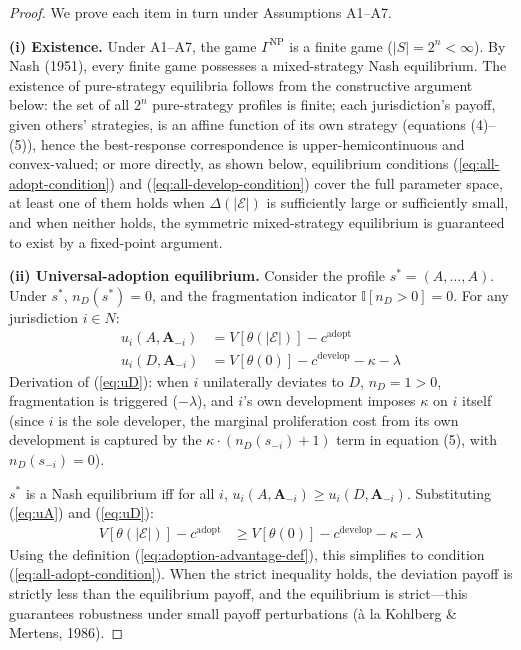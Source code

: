 \documentclass[12pt,a4paper]{article}
\theoremstyle{definition}
\theoremstyle{remark}
\begin{document}
\begin{proof}
We prove each item in turn under Assumptions A1--A7.

\textbf{(i) Existence.} Under A1--A7, the game $\Gamma^{\text{NP}}$ is a finite game ($|S| = 2^n < \infty$). By Nash (1951), every finite game possesses a mixed-strategy Nash equilibrium. The existence of pure-strategy equilibria follows from the constructive argument below: the set of all $2^n$ pure-strategy profiles is finite; each jurisdiction's payoff, given others' strategies, is an affine function of its own strategy (equations (4)--(5)), hence the best-response correspondence is upper-hemicontinuous and convex-valued; or more directly, as shown below, equilibrium conditions (\ref{eq:all-adopt-condition}) and (\ref{eq:all-develop-condition}) cover the full parameter space, at least one of them holds when $\Delta(|\mathcal{E}|)$ is sufficiently large or sufficiently small, and when neither holds, the symmetric mixed-strategy equilibrium is guaranteed to exist by a fixed-point argument.

\textbf{(ii) Universal-adoption equilibrium.} Consider the profile $s^* = (A, \ldots, A)$. Under $s^*$, $n_D(s^*) = 0$, and the fragmentation indicator $\mathbb{I}[n_D > 0] = 0$. For any jurisdiction $i \in N$:
\begin{align}
u_i(A, \mathbf{A}_{-i}) &= V[\theta(|\mathcal{E}|)] - c^{\text{adopt}} \label{eq:uA}\\
u_i(D, \mathbf{A}_{-i}) &= V[\theta(0)] - c^{\text{develop}} - \kappa - \lambda \label{eq:uD}
\end{align}
Derivation of (\ref{eq:uD}): when $i$ unilaterally deviates to $D$, $n_D = 1 > 0$, fragmentation is triggered ($-\lambda$), and $i$'s own development imposes $\kappa$ on $i$ itself (since $i$ is the sole developer, the marginal proliferation cost from its own development is captured by the $\kappa \cdot (n_D(s_{-i}) + 1)$ term in equation (5), with $n_D(s_{-i}) = 0$).

$s^*$ is a Nash equilibrium iff for all $i$, $u_i(A, \mathbf{A}_{-i}) \geq u_i(D, \mathbf{A}_{-i})$. Substituting (\ref{eq:uA}) and (\ref{eq:uD}):
\begin{align}
V[\theta(|\mathcal{E}|)] - c^{\text{adopt}} &\geq V[\theta(0)] - c^{\text{develop}} - \kappa - \lambda
\end{align}
Using the definition (\ref{eq:adoption-advantage-def}), this simplifies to condition (\ref{eq:all-adopt-condition}). When the strict inequality holds, the deviation payoff is strictly less than the equilibrium payoff, and the equilibrium is strict—this guarantees robustness under small payoff perturbations (à la Kohlberg \& Mertens, 1986).


\end{proof}
\end{document}
